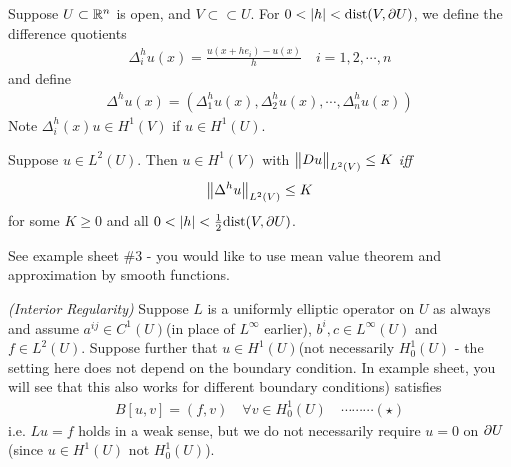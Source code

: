 \documentclass[12pt,a4paper]{report}
\newenvironment{proof}
{\begin{changemargin}{1cm}{0.5cm} 
	}%
	{\end{changemargin}
}
\begin{document}
Suppose $U\subset \mathbb{R}^n$ is open, and $V \subset \subset U$. For $0< |h| < \text{dist}(V, \partial U)$, we define the difference quotients
\begin{align*}
\Delta_i^h u(x) = \frac{u(x+ he_i) - u(x)}{h} \quad i=1,2,\cdots, n
\end{align*}
and define
\begin{align*}
\Delta^h u(x) = (\Delta_1^h u(x), \Delta_2^h u(x), \cdots, \Delta_n^h u(x))
\end{align*}
Note $\Delta_i^h(x) u \in H^1(V)$ if $u\in H^1(U)$.
\s

\lem Suppose $u \in L^2(U)$. Then $u\in H^1(V)$ with $\bigl\lVert Du\bigr\rVert_{L^2(V)} \leq K$ \emph{iff}
\begin{align*}
\bigl\lVert\Delta^h u\bigr\rVert_{L^2(V)} \leq K
\end{align*}
for some $K\geq 0$ and all $0< |h|< \frac{1}{2}\text{dist}(V, \partial U)$.
\begin{proof}
\pf See example sheet \#3 - you would like to use mean value theorem and approximation by smooth functions. 
\end{proof}
\s

\thm \emph{(Interior Regularity)} Suppose $L$ is a uniformly elliptic operator on $U$ as always and assume $a^{ij} \in C^1(U)$(in place of $L^{\infty}$ earlier), $b^i, c\in L^{\infty}(U)$ and $f\in L^2(U)$. Suppose further that $u \in H^1(U)$(not necessarily $H_0^1(U)$ - the setting here does not depend on the boundary condition. In example sheet, you will see that this also works for different boundary conditions) satisfies
\begin{align*}
B[u,v] = (f, v) \quad \forall v \in H_0^1(U) \quad \cdots\cdots\cdots (\star)
\end{align*}
i.e. $Lu=f$ holds in a weak sense, but we do not necessarily require $u=0$ on $\partial U$ (since $u\in H^1(U)$ not $H_0^1(U)$).
\end{document}
